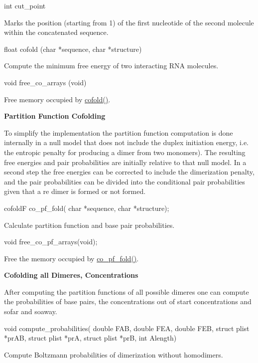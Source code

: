\begin{DoxyVerb}
int cut_point
\end{DoxyVerb}
 Marks the position (starting from 1) of the first nucleotide of the second molecule within the concatenated sequence. 

\begin{DoxyVerb}
float cofold (char *sequence,
              char *structure)
\end{DoxyVerb}
 Compute the minimum free energy of two interacting RNA molecules. 

\begin{DoxyVerb}
void  free_co_arrays (void)
\end{DoxyVerb}
 Free memory occupied by \hyperlink{cofold_8h_abc8517f22cfe70595ee81fc837910d52}{cofold()}. 

{\bfseries Partition Function Cofolding}

To simplify the implementation the partition function computation is done internally in a null model that does not include the duplex initiation energy, i.e. the entropic penalty for producing a dimer from two monomers). The resulting free energies and pair probabilities are initially relative to that null model. In a second step the free energies can be corrected to include the dimerization penalty, and the pair probabilities can be divided into the conditional pair probabilities given that a re dimer is formed or not formed.

\begin{DoxyVerb}
cofoldF co_pf_fold( char *sequence,
                    char *structure);
\end{DoxyVerb}
 Calculate partition function and base pair probabilities. 

\begin{DoxyVerb}
void    free_co_pf_arrays(void);
\end{DoxyVerb}
 Free the memory occupied by \hyperlink{part__func__co_8h_aa86a5f998789ed71813d23d7307a791b}{co\_\-pf\_\-fold()}. 

{\bfseries Cofolding all Dimeres, Concentrations}

After computing the partition functions of all possible dimeres one can compute the probabilities of base pairs, the concentrations out of start concentrations and sofar and soaway.

\begin{DoxyVerb}
void  compute_probabilities(
              double FAB,
              double FEA,
              double FEB,
              struct plist  *prAB,
              struct plist  *prA,
              struct plist  *prB,
              int Alength)
\end{DoxyVerb}
 Compute Boltzmann probabilities of dimerization without homodimers. 

